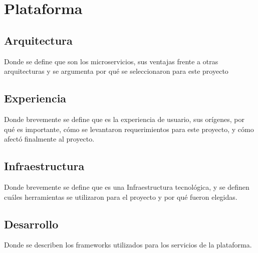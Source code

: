 \section{Plataforma}

\subsection{Arquitectura}

Donde se define que son los microservicios, sus ventajas frente a otras arquitecturas y se argumenta por qué se seleccionaron para este proyecto

\subsection{Experiencia}

Donde brevemente se define que es la experiencia de usuario, sus orígenes, por qué es importante, cómo se levantaron requerimientos para este proyecto, y cómo afectó finalmente al proyecto.

\subsection{Infraestructura}

Donde brevemente se define que es una Infraestructura tecnológica, y se definen cuáles herramientas se utilizaron para el proyecto y por qué fueron elegidas.

\subsection{Desarrollo}

Donde se describen los frameworks utilizados para los servicios de la plataforma.